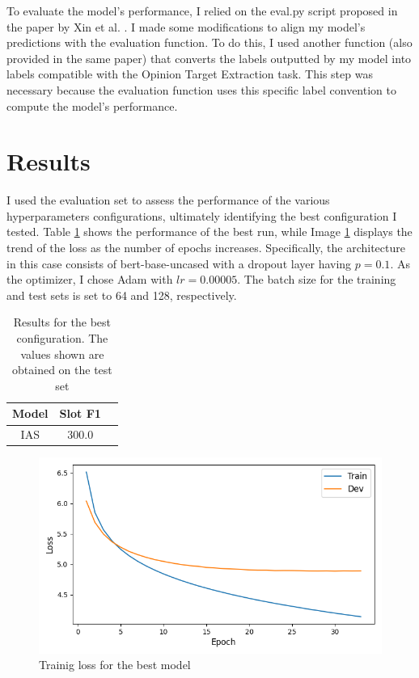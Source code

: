 \documentclass[a4paper]{article}
\begin{document}
To evaluate the model’s performance, I relied on the eval.py script proposed in the paper by Xin et al. \cite{li2019unifiedmodelopiniontarget}.
I made some modifications to align my model’s predictions with the evaluation function. To do this, I used another function (also provided in the same paper) that converts the labels outputted by my model into labels compatible with the Opinion Target Extraction task. This step was necessary because the evaluation function uses this specific label convention to compute the model’s performance.


\section{Results}
I used the evaluation set to assess the performance of the various hyperparameters configurations, ultimately identifying the best configuration I tested.
Table \ref{tab:results1} shows the performance of the best run, while Image \ref{fig:fig1} displays the trend of the loss as the number of epochs increases.
Specifically, the architecture in this case consists of bert-base-uncased with a dropout layer having \(p=0.1\). As the optimizer, I chose Adam with \(lr=0.00005\). The batch size for the training and test sets is set to 64 and 128, respectively.


\begin{table}[h]
  \centering
  \begin{tabular}{|c|c|c|}
    \hline
    \textbf{Model} & \textbf{Slot F1} \\
    \hline
    IAS & 300.0 \\
    \hline
  \end{tabular}
  \caption{Results for the best configuration. The values shown are obtained on the test set}
  \label{tab:results1}

\end{table}

\begin{figure}[h]
  \includegraphics[width=\linewidth]{./images/plot_1_loss.png}
  \caption{Trainig loss for the best model}
  \label{fig:fig1}
\end{figure}





\end{document}
